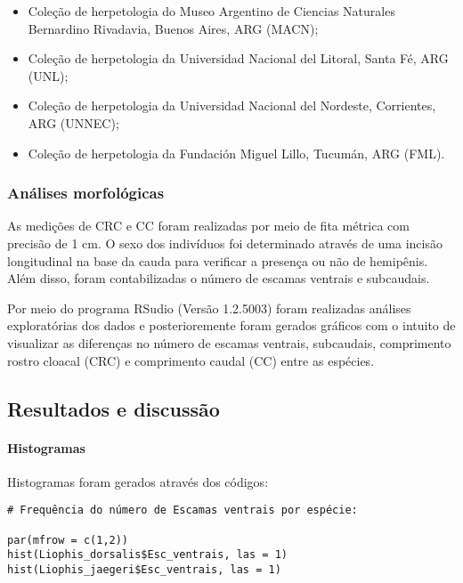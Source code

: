 \documentclass[
]{article}
\begin{document}
\begin{itemize}
\item
  Coleção de herpetologia do Museo Argentino de Ciencias Naturales
  Bernardino Rivadavia, Buenos Aires, ARG (MACN);
\item
  Coleção de herpetologia da Universidad Nacional del Litoral, Santa Fé,
  ARG (UNL);
\item
  Coleção de herpetologia da Universidad Nacional del Nordeste,
  Corrientes, ARG (UNNEC);
\item
  Coleção de herpetologia da Fundación Miguel Lillo, Tucumán, ARG (FML).
\end{itemize}

\hypertarget{anuxe1lises-morfoluxf3gicas}{%
\subsubsection{Análises
morfológicas}\label{anuxe1lises-morfoluxf3gicas}}

As medições de CRC e CC foram realizadas por meio de fita métrica com
precisão de 1 cm. O sexo dos indivíduos foi determinado através de uma
incisão longitudinal na base da cauda para verificar a presença ou não
de hemipênis. Além disso, foram contabilizadas o número de escamas
ventrais e subcaudais.

Por meio do programa RSudio (Versão 1.2.5003) foram realizadas análises
exploratórias dos dados e posterioremente foram gerados gráficos com o
intuito de visualizar as diferenças no número de escamas ventrais,
subcaudais, comprimento rostro cloacal (CRC) e comprimento caudal (CC)
entre as espécies.

\hypertarget{resultados-e-discussuxe3o}{%
\subsection{Resultados e discussão}\label{resultados-e-discussuxe3o}}

\hypertarget{histogramas}{%
\paragraph{Histogramas}\label{histogramas}}

Histogramas foram gerados através dos códigos:

\begin{verbatim}
# Frequência do número de Escamas ventrais por espécie:

par(mfrow = c(1,2))
hist(Liophis_dorsalis$Esc_ventrais, las = 1)
hist(Liophis_jaegeri$Esc_ventrais, las = 1)
\end{verbatim}
\end{document}
